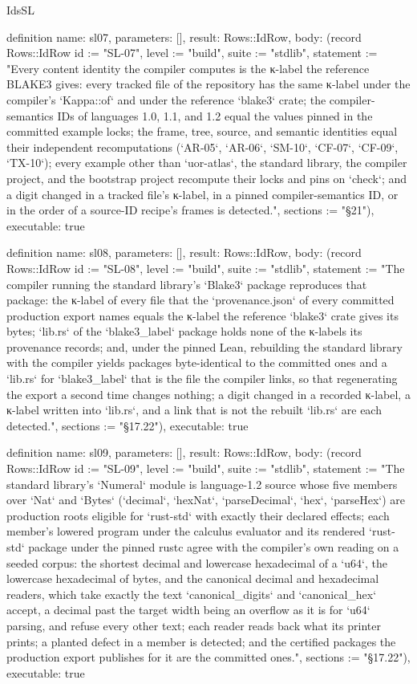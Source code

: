 \begin{lexlean}{IdsSL}
\begin{semanticmodule}
definition{
  name: sl07,
  parameters: [],
  result: Rows::IdRow,
  body: (record Rows::IdRow {id := "SL-07", level := "build", suite := "stdlib", statement := "Every content identity the compiler computes is the κ-label the reference BLAKE3 gives: every tracked file of the repository has the same κ-label under the compiler's `Kappa::of` and under the reference `blake3` crate; the compiler-semantics IDs of languages 1.0, 1.1, and 1.2 equal the values pinned in the committed example locks; the frame, tree, source, and semantic identities equal their independent recomputations (`AR-05`, `AR-06`, `SM-10`, `CF-07`, `CF-09`, `TX-10`); every example other than `uor-atlas`, the standard library, the compiler project, and the bootstrap project recompute their locks and pins on `check`; and a digit changed in a tracked file's κ-label, in a pinned compiler-semantics ID, or in the order of a source-ID recipe's frames is detected.", sections := "§21"}),
  executable: true
}

definition{
  name: sl08,
  parameters: [],
  result: Rows::IdRow,
  body: (record Rows::IdRow {id := "SL-08", level := "build", suite := "stdlib", statement := "The compiler running the standard library's `Blake3` package reproduces that package: the κ-label of every file that the `provenance.json` of every committed production export names equals the κ-label the reference `blake3` crate gives its bytes; `lib.rs` of the `blake3_label` package holds none of the κ-labels its provenance records; and, under the pinned Lean, rebuilding the standard library with the compiler yields packages byte-identical to the committed ones and a `lib.rs` for `blake3_label` that is the file the compiler links, so that regenerating the export a second time changes nothing; a digit changed in a recorded κ-label, a κ-label written into `lib.rs`, and a link that is not the rebuilt `lib.rs` are each detected.", sections := "§17.22"}),
  executable: true
}

definition{
  name: sl09,
  parameters: [],
  result: Rows::IdRow,
  body: (record Rows::IdRow {id := "SL-09", level := "build", suite := "stdlib", statement := "The standard library's `Numeral` module is language-1.2 source whose five members over `Nat` and `Bytes` (`decimal`, `hexNat`, `parseDecimal`, `hex`, `parseHex`) are production roots eligible for `rust-std` with exactly their declared effects; each member's lowered program under the calculus evaluator and its rendered `rust-std` package under the pinned rustc agree with the compiler's own reading on a seeded corpus: the shortest decimal and lowercase hexadecimal of a `u64`, the lowercase hexadecimal of bytes, and the canonical decimal and hexadecimal readers, which take exactly the text `canonical_digits` and `canonical_hex` accept, a decimal past the target width being an overflow as it is for `u64` parsing, and refuse every other text; each reader reads back what its printer prints; a planted defect in a member is detected; and the certified packages the production export publishes for it are the committed ones.", sections := "§17.22"}),
  executable: true
}


\end{semanticmodule}
\end{lexlean}
